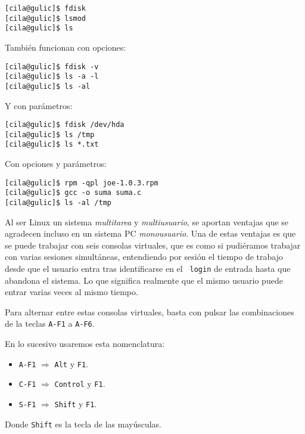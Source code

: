 \begin{verbatim}
[cila@gulic]$ fdisk
[cila@gulic]$ lsmod
[cila@gulic]$ ls
\end{verbatim}

También funcionan con opciones:

\begin{verbatim}
[cila@gulic]$ fdisk -v
[cila@gulic]$ ls -a -l
[cila@gulic]$ ls -al
\end{verbatim}

Y con parámetros:

\begin{verbatim}
[cila@gulic]$ fdisk /dev/hda
[cila@gulic]$ ls /tmp
[cila@gulic]$ ls *.txt
\end{verbatim}

Con opciones y parámetros:

\begin{verbatim}
[cila@gulic]$ rpm -qpl joe-1.0.3.rpm
[cila@gulic]$ gcc -o suma suma.c
[cila@gulic]$ ls -al /tmp
\end{verbatim}

Al  ser Linux  un sistema  {\em multitarea}  y {\em  multiusuario}, se
aportan  ventajas que  se  agradecen  incluso en  un  sistema PC  {\em
monousuario}.  Una de  estas ventajas  es  que se  puede trabajar  con
seis  consolas  virtuales, que  es  como  si pudiéramos  trabajar  con
varias  sesiones  simultáneas, entendiendo  por  sesión  el tiempo  de
trabajo  desde que  el usuario  entra  tras identificarse  en el  {\tt
login} de entrada  hasta que abandona el  sistema. Lo que
significa realmente que el mismo  usuario puede entrar varias veces al
mismo tiempo.

Para alternar  entre estas  consolas virtuales,  basta con  pulsar las
combinaciones de  la teclas  {\tt A-F1} a  {\tt A-F6}.

\begin{nota}
En lo sucesivo usaremos esta nomenclatura:\\
\vspace{-1cm}
\begin{itemize}
\setlength{\itemsep}{-15pt}
\item {\tt A-F1} $\Rightarrow$ {\tt Alt} y {\tt  F1}.\\
\item {\tt C-F1} $\Rightarrow$ {\tt Control} y {\tt F1}.\\
\item {\tt S-F1} $\Rightarrow$ {\tt Shift}  y {\tt F1}.\\
\end{itemize}
\vspace{-1cm}
Donde {\tt Shift} es la tecla de las mayúsculas.
\end{nota}


